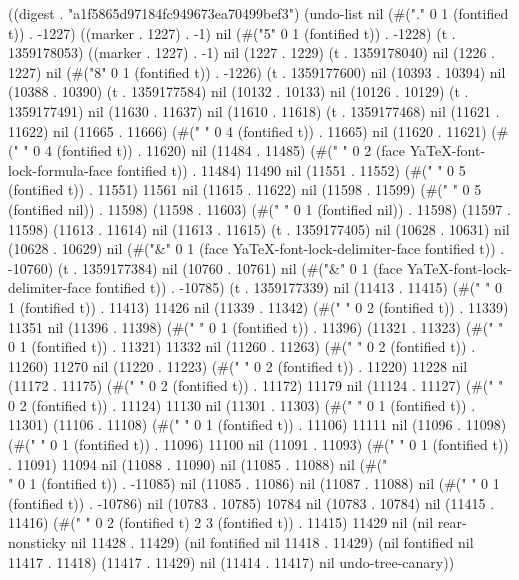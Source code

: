 
((digest . "a1f5865d97184fc949673ea70499bef3") (undo-list nil (#("." 0 1 (fontified t)) . -1227) ((marker . 1227) . -1) nil (#("5" 0 1 (fontified t)) . -1228) (t . 1359178053) ((marker . 1227) . -1) nil (1227 . 1229) (t . 1359178040) nil (1226 . 1227) nil (#("8" 0 1 (fontified t)) . -1226) (t . 1359177600) nil (10393 . 10394) nil (10388 . 10390) (t . 1359177584) nil (10132 . 10133) nil (10126 . 10129) (t . 1359177491) nil (11630 . 11637) nil (11610 . 11618) (t . 1359177468) nil (11621 . 11622) nil (11665 . 11666) (#("		  " 0 4 (fontified t)) . 11665) nil (11620 . 11621) (#("		  " 0 4 (fontified t)) . 11620) nil (11484 . 11485) (#("  " 0 2 (face YaTeX-font-lock-formula-face fontified t)) . 11484) 11490 nil (11551 . 11552) (#("		   " 0 5 (fontified t)) . 11551) 11561 nil (11615 . 11622) nil (11598 . 11599) (#("		   " 0 5 (fontified nil)) . 11598) (11598 . 11603) (#(" " 0 1 (fontified nil)) . 11598) (11597 . 11598) (11613 . 11614) nil (11613 . 11615) (t . 1359177405) nil (10628 . 10631) nil (10628 . 10629) nil (#("&" 0 1 (face YaTeX-font-lock-delimiter-face fontified t)) . -10760) (t . 1359177384) nil (10760 . 10761) nil (#("&" 0 1 (face YaTeX-font-lock-delimiter-face fontified t)) . -10785) (t . 1359177339) nil (11413 . 11415) (#(" " 0 1 (fontified t)) . 11413) 11426 nil (11339 . 11342) (#("  " 0 2 (fontified t)) . 11339) 11351 nil (11396 . 11398) (#(" " 0 1 (fontified t)) . 11396) (11321 . 11323) (#(" " 0 1 (fontified t)) . 11321) 11332 nil (11260 . 11263) (#("  " 0 2 (fontified t)) . 11260) 11270 nil (11220 . 11223) (#("  " 0 2 (fontified t)) . 11220) 11228 nil (11172 . 11175) (#("  " 0 2 (fontified t)) . 11172) 11179 nil (11124 . 11127) (#("  " 0 2 (fontified t)) . 11124) 11130 nil (11301 . 11303) (#(" " 0 1 (fontified t)) . 11301) (11106 . 11108) (#(" " 0 1 (fontified t)) . 11106) 11111 nil (11096 . 11098) (#(" " 0 1 (fontified t)) . 11096) 11100 nil (11091 . 11093) (#(" " 0 1 (fontified t)) . 11091) 11094 nil (11088 . 11090) nil (11085 . 11088) nil (#("\\" 0 1 (fontified t)) . -11085) nil (11085 . 11086) nil (11087 . 11088) nil (#(" " 0 1 (fontified t)) . -10786) nil (10783 . 10785) 10784 nil (10783 . 10784) nil (11415 . 11416) (#("   " 0 2 (fontified t) 2 3 (fontified t)) . 11415) 11429 nil (nil rear-nonsticky nil 11428 . 11429) (nil fontified nil 11418 . 11429) (nil fontified nil 11417 . 11418) (11417 . 11429) nil (11414 . 11417) nil undo-tree-canary))
